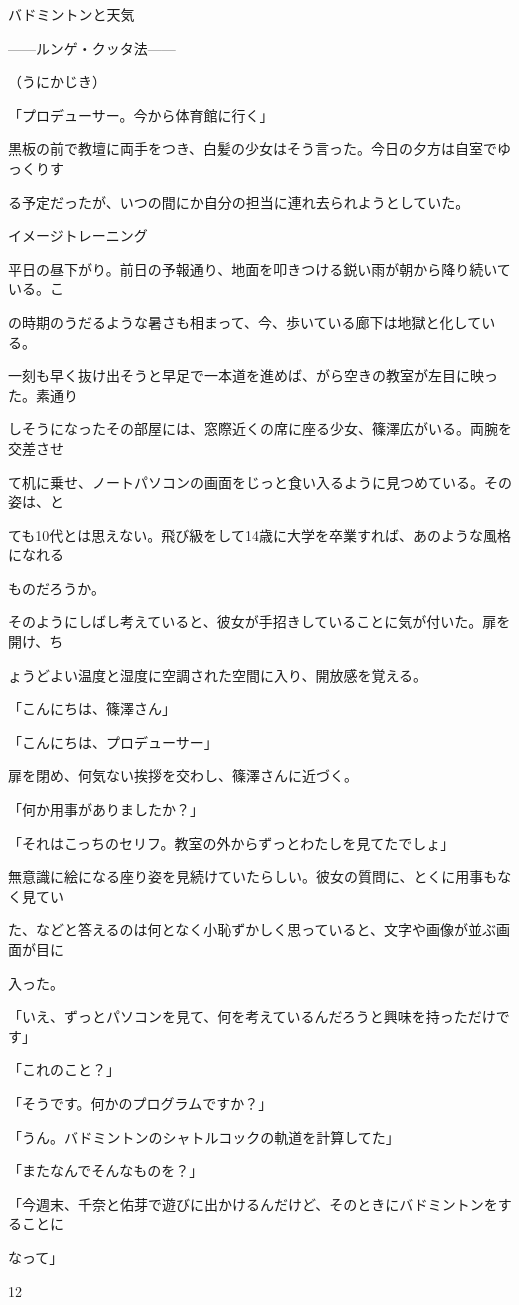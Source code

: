 バドミントンと天気\par
——ルンゲ‧クッタ法——\par
（うにかじき）\par
「プロデューサー。今から体育館に⾏く」\par
黒板の前で教壇に両⼿をつき、⽩髪の少⼥はそう⾔った。今⽇の⼣⽅は⾃室でゆっくりす\par
る予定だったが、いつの間にか⾃分の担当に連れ去られようとしていた。\par
イメージトレーニング\par
平⽇の昼下がり。前⽇の予報通り、地⾯を叩きつける鋭い⾬が朝から降り続いている。こ\par
の時期のうだるような暑さも相まって、今、歩いている廊下は地獄と化している。\par
⼀刻も早く抜け出そうと早⾜で⼀本道を進めば、がら空きの教室が左⽬に映った。素通り\par
しそうになったその部屋には、窓際近くの席に座る少⼥、篠澤広がいる。両腕を交差させ\par
て机に乗せ、ノートパソコンの画⾯をじっと⾷い⼊るように⾒つめている。その姿は、と\par
ても10代とは思えない。⾶び級をして14歳に⼤学を卒業すれば、あのような⾵格になれる\par
ものだろうか。\par
そのようにしばし考えていると、彼⼥が⼿招きしていることに気が付いた。扉を開け、ち\par
ょうどよい温度と湿度に空調された空間に⼊り、開放感を覚える。\par
「こんにちは、篠澤さん」\par
「こんにちは、プロデューサー」\par
扉を閉め、何気ない挨拶を交わし、篠澤さんに近づく。\par
「何か⽤事がありましたか？」\par
「それはこっちのセリフ。教室の外からずっとわたしを⾒てたでしょ」\par
無意識に絵になる座り姿を⾒続けていたらしい。彼⼥の質問に、とくに⽤事もなく⾒てい\par
た、などと答えるのは何となく⼩恥ずかしく思っていると、⽂字や画像が並ぶ画⾯が⽬に\par
⼊った。\par
「いえ、ずっとパソコンを⾒て、何を考えているんだろうと興味を持っただけです」\par
「これのこと？」\par
「そうです。何かのプログラムですか？」\par
「うん。バドミントンのシャトルコックの軌道を計算してた」\par
「またなんでそんなものを？」\par
「今週末、千奈と佑芽で遊びに出かけるんだけど、そのときにバドミントンをすることに\par
なって」\par
12\par

